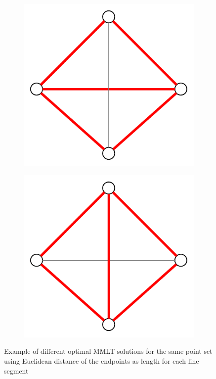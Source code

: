 \begin{figure}[ht]
  \centering
  \begin{subfigure}{0.25\textwidth}
    \centering
    \includegraphics[width=\textwidth]{img/non_unique_optimal_1.pdf}
  \end{subfigure}
  \hspace{2em}
  \VRule
  \hspace{2em}
  \centering
  \begin{subfigure}{0.25\textwidth}
    \centering
    \includegraphics[width=\textwidth]{img/non_unique_optimal_2.pdf}
  \end{subfigure}
  \caption{\label{fig:non_unique_optimal}%
    Example of different optimal \gls{MMLT} solutions %
    for the same point set using Euclidean distance of the endpoints %
    as length for each line segment}
\end{figure}


